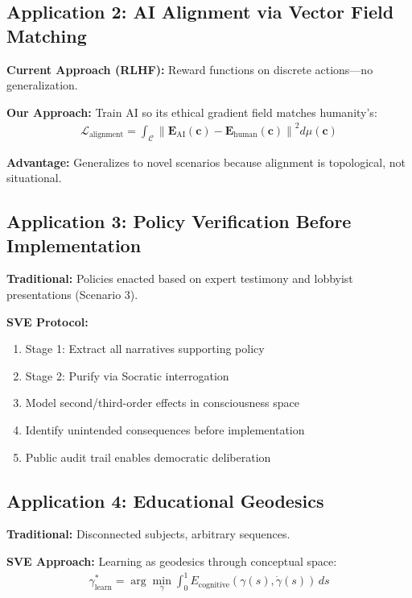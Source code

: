 \documentclass[11pt,a4paper]{article}
\theoremstyle{definition}
\theoremstyle{remark}
\newcommand{\CC}{\mathcal{C}}
\newcommand{\EE}{\mathbf{E}}
\newcommand{\cc}{\mathbf{c}}
\begin{document}
\subsection{Application 2: AI Alignment via Vector Field Matching}

\textbf{Current Approach (RLHF):} Reward functions on discrete actions—no generalization.

\textbf{Our Approach:} Train AI so its ethical gradient field matches humanity's:
\begin{align}
\mathcal{L}_{\text{alignment}} = \int_{\CC} \left\|\EE_{\text{AI}}(\cc) - \EE_{\text{human}}(\cc)\right\|^2 d\mu(\cc)
\end{align}

\textbf{Advantage:} Generalizes to novel scenarios because alignment is topological, not situational.

\subsection{Application 3: Policy Verification Before Implementation}

\textbf{Traditional:} Policies enacted based on expert testimony and lobbyist presentations (Scenario 3).

\textbf{SVE Protocol:}
\begin{enumerate}
\item Stage 1: Extract all narratives supporting policy
\item Stage 2: Purify via Socratic interrogation
\item Model second/third-order effects in consciousness space
\item Identify unintended consequences before implementation
\item Public audit trail enables democratic deliberation
\end{enumerate}

\subsection{Application 4: Educational Geodesics}

\textbf{Traditional:} Disconnected subjects, arbitrary sequences.

\textbf{SVE Approach:} Learning as geodesics through conceptual space:
\begin{align}
\gamma_{\text{learn}}^* = \arg\min_{\gamma} \int_0^1 E_{\text{cognitive}}(\gamma(s), \dot{\gamma}(s)) \, ds
\end{align}
\end{document}
